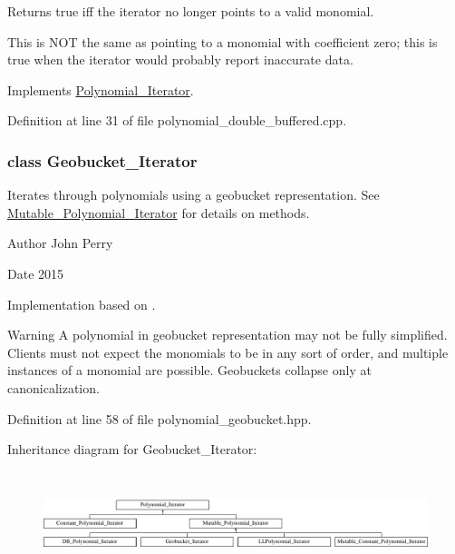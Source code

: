 \begin{DoxyReturn}{Returns}
true iff the iterator no longer points to a valid monomial.
\end{DoxyReturn}
This is N\+OT the same as pointing to a monomial with coefficient zero; this is true when the iterator would probably report inaccurate data. 

Implements \hyperlink{group___iterator_group_ac571e120134088d6067718bbad513e2d}{Polynomial\+\_\+\+Iterator}.



Definition at line 31 of file polynomial\+\_\+double\+\_\+buffered.\+cpp.

\label{class_geobucket___iterator}
\subsubsection{class Geobucket\+\_\+\+Iterator}
Iterates through polynomials using a geobucket representation. See \hyperlink{group___iterator_group_class_mutable___polynomial___iterator}{Mutable\+\_\+\+Polynomial\+\_\+\+Iterator} for details on methods. 

\begin{DoxyAuthor}{Author}
John Perry 
\end{DoxyAuthor}
\begin{DoxyDate}{Date}
2015
\end{DoxyDate}
Implementation based on \cite{YanGeobuckets}. \begin{DoxyWarning}{Warning}
A polynomial in geobucket representation may not be fully simplified. Clients must not expect the monomials to be in any sort of order, and multiple instances of a monomial are possible. Geobuckets collapse only at canonicalization. 
\end{DoxyWarning}


Definition at line 58 of file polynomial\+\_\+geobucket.\+hpp.

Inheritance diagram for Geobucket\+\_\+\+Iterator\+:\begin{figure}[H]
\begin{center}
\leavevmode
\includegraphics[height=3.000000cm]{group___iterator_group}
\end{center}
\end{figure}
